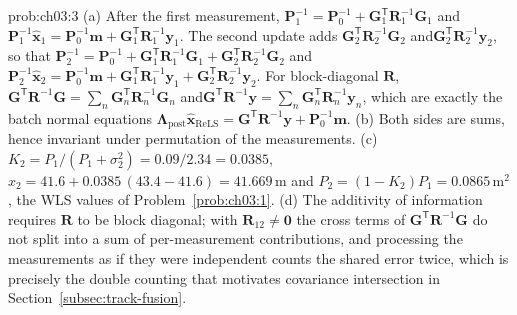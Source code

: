 \documentclass[graybox,envcountchap]{style/SNmono}
\providecommand{\DIFaddbegin}{} %
\providecommand{\DIFaddend}{} %
\begin{document}
\begin{sol}{prob:ch03:3}
(a) After the first measurement, $\mathbf{P}_1^{-1}=\mathbf{P}_0^{-1}+\mathbf{G}_1^{\mathsf T}\mathbf{R}_1^{-1}\mathbf{G}_1$ and\DIFaddbegin \allowbreak \DIFaddend $\mathbf{P}_1^{-1}\widehat{\mathbf{x}}_1=\mathbf{P}_0^{-1}\mathbf{m}+\mathbf{G}_1^{\mathsf T}\mathbf{R}_1^{-1}\mathbf{y}_1$. The second update adds $\mathbf{G}_2^{\mathsf T}\mathbf{R}_2^{-1}\mathbf{G}_2$ and\DIFaddbegin \allowbreak \DIFaddend $\mathbf{G}_2^{\mathsf T}\mathbf{R}_2^{-1}\mathbf{y}_2$, so that
$\mathbf{P}_2^{-1}=\mathbf{P}_0^{-1}+\mathbf{G}_1^{\mathsf T}\mathbf{R}_1^{-1}\mathbf{G}_1+\mathbf{G}_2^{\mathsf T}\mathbf{R}_2^{-1}\mathbf{G}_2$ and
$\mathbf{P}_2^{-1}\widehat{\mathbf{x}}_2=\mathbf{P}_0^{-1}\mathbf{m}+\mathbf{G}_1^{\mathsf T}\mathbf{R}_1^{-1}\mathbf{y}_1+\mathbf{G}_2^{\mathsf T}\mathbf{R}_2^{-1}\mathbf{y}_2$.
For block-diagonal $\mathbf{R}$, $\mathbf{G}^{\mathsf T}\mathbf{R}^{-1}\mathbf{G}=\sum_n\mathbf{G}_n^{\mathsf T}\mathbf{R}_n^{-1}\mathbf{G}_n$ and\DIFaddbegin \allowbreak \DIFaddend $\mathbf{G}^{\mathsf T}\mathbf{R}^{-1}\mathbf{y}=\sum_n\mathbf{G}_n^{\mathsf T}\mathbf{R}_n^{-1}\mathbf{y}_n$, which are exactly the batch normal equations $\mathbf{\Lambda}_{\mathrm{post}}\widehat{\mathbf{x}}_{\mathrm{ReLS}}=\mathbf{G}^{\mathsf T}\mathbf{R}^{-1}\mathbf{y}+\mathbf{P}_0^{-1}\mathbf{m}$.
(b) Both sides are sums, hence invariant under permutation of the measurements.
(c) $K_2=P_1/(P_1+\sigma_2^{2})=0.09/2.34=0.0385$, $\widehat{x}_2=41.6+0.0385\,(43.4-41.6)=41.669$\,m and $P_2=(1-K_2)P_1=0.0865$\,m$^{2}$, the WLS values of Problem~\ref{prob:ch03:1}.
(d) The additivity of information requires $\mathbf{R}$ to be block diagonal; with $\mathbf{R}_{12}\neq\mathbf{0}$ the cross terms of $\mathbf{G}^{\mathsf T}\mathbf{R}^{-1}\mathbf{G}$ do not split into a sum of per-measurement contributions, and processing the measurements as if they were independent counts the shared error twice, which is precisely the double counting that motivates covariance intersection in Section~\ref{subsec:track-fusion}.
\end{sol}
\end{document}
